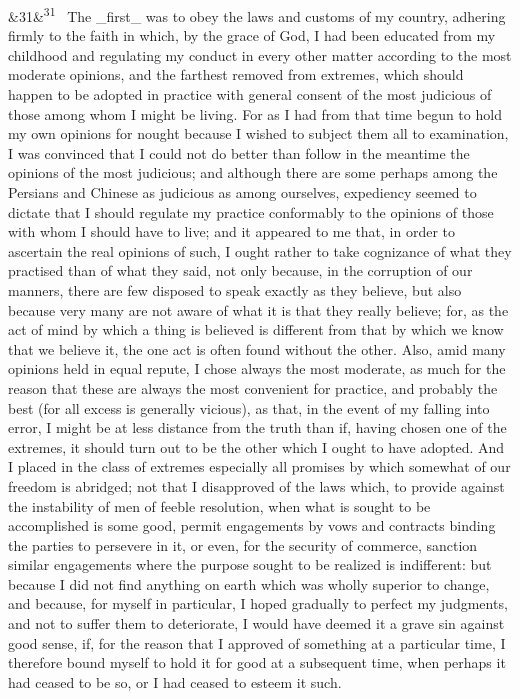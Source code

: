 \documentclass[12pt]{article}
\newcommand{\para}[1][]{\par\noindent\ifx&#1&\else\textsuperscript{\footnotesize #1}~\fi}
\begin{document}
\para[31] The \_first\_ was to obey the laws and customs of my country, adhering firmly to the faith in which, by the grace of God, I had been educated from my childhood and regulating my conduct in every other matter according to the most moderate opinions, and the farthest removed from extremes, which should happen to be adopted in practice with general consent of the most judicious of those among whom I might be living. For as I had from that time begun to hold my own opinions for nought because I wished to subject them all to examination, I was convinced that I could not do better than follow in the meantime the opinions of the most judicious; and although there are some perhaps among the Persians and Chinese as judicious as among ourselves, expediency seemed to dictate that I should regulate my practice conformably to the opinions of those with whom I should have to live; and it appeared to me that, in order to ascertain the real opinions of such, I ought rather to take cognizance of what they practised than of what they said, not only because, in the corruption of our manners, there are few disposed to speak exactly as they believe, but also because very many are not aware of what it is that they really believe; for, as the act of mind by which a thing is believed is different from that by which we know that we believe it, the one act is often found without the other. Also, amid many opinions held in equal repute, I chose always the most moderate, as much for the reason that these are always the most convenient for practice, and probably the best (for all excess is generally vicious), as that, in the event of my falling into error, I might be at less distance from the truth than if, having chosen one of the extremes, it should turn out to be the other which I ought to have adopted. And I placed in the class of extremes especially all promises by which somewhat of our freedom is abridged; not that I disapproved of the laws which, to provide against the instability of men of feeble resolution, when what is sought to be accomplished is some good, permit engagements by vows and contracts binding the parties to persevere in it, or even, for the security of commerce, sanction similar engagements where the purpose sought to be realized is indifferent: but because I did not find anything on earth which was wholly superior to change, and because, for myself in particular, I hoped gradually to perfect my judgments, and not to suffer them to deteriorate, I would have deemed it a grave sin against good sense, if, for the reason that I approved of something at a particular time, I therefore bound myself to hold it for good at a subsequent time, when perhaps it had ceased to be so, or I had ceased to esteem it such.
\end{document}
